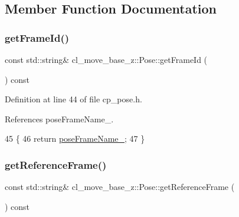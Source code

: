 \subsection{Member Function Documentation}
\mbox{\label{classcl__move__base__z_1_1Pose_aa3c4adc72922e5385f4586e6e798db23}} 
\subsubsection{\texorpdfstring{get\+Frame\+Id()}{getFrameId()}}
{\footnotesize\ttfamily const std\+::string\& cl\+\_\+move\+\_\+base\+\_\+z\+::\+Pose\+::get\+Frame\+Id (\begin{DoxyParamCaption}{ }\end{DoxyParamCaption}) const\hspace{0.3cm}{\ttfamily [inline]}}



Definition at line 44 of file cp\+\_\+pose.\+h.



References pose\+Frame\+Name\+\_\+.


\begin{DoxyCode}
45     \{
46         \textcolor{keywordflow}{return} \hyperlink{classcl__move__base__z_1_1Pose_a4f45be8e2fd73e618d815582a4ca8efe}{poseFrameName\_};
47     \}
\end{DoxyCode}
\mbox{\label{classcl__move__base__z_1_1Pose_af8c2dc151e74aa8da6b283d1c8563051}} 
\subsubsection{\texorpdfstring{get\+Reference\+Frame()}{getReferenceFrame()}}
{\footnotesize\ttfamily const std\+::string\& cl\+\_\+move\+\_\+base\+\_\+z\+::\+Pose\+::get\+Reference\+Frame (\begin{DoxyParamCaption}{ }\end{DoxyParamCaption}) const\hspace{0.3cm}{\ttfamily [inline]}}



